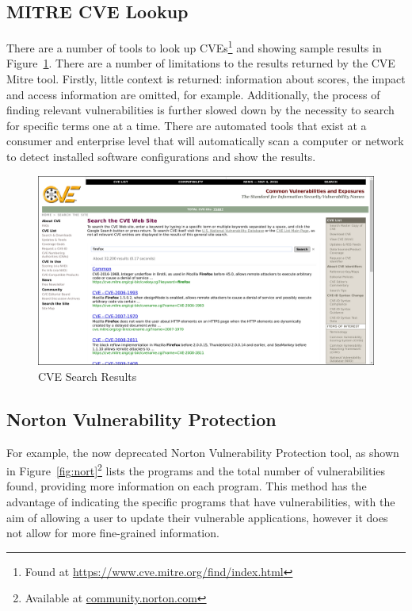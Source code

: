 \subsection{MITRE CVE Lookup}\label{sec:mit}

There are a number of tools to look up CVEs\footnote{Found at
    \url{https://www.cve.mitre.org/find/index.html}} and showing sample results
in Figure~\ref{fig:cve}.  There are a number of limitations to the results
returned by the CVE Mitre tool.  Firstly, little context is returned:
information about scores, the impact and access information are omitted, for
example.  Additionally, the process of finding relevant vulnerabilities is
further slowed down by the necessity to search for specific terms one at a
time.  There are automated tools that exist at a consumer and enterprise level
that will automatically scan a computer or network to detect installed software
configurations and show the results.

\begin{figure} \centering \includegraphics[width=0.9\linewidth]{cve-lookup}
\caption{CVE Search Results}\label{fig:cve} \end{figure}

\subsection{Norton Vulnerability Protection}\label{sec:nor}

For example, the now deprecated Norton Vulnerability Protection tool, as shown
in Figure~\ref{fig:nort}\footnote{Available at \url{community.norton.com}}
lists the programs and the total number of  vulnerabilities found, providing
more information on each program.  This method has the advantage of indicating
the specific programs that have vulnerabilities, with the aim of allowing a
user to update their vulnerable applications, however it does not allow for
more fine-grained information.



